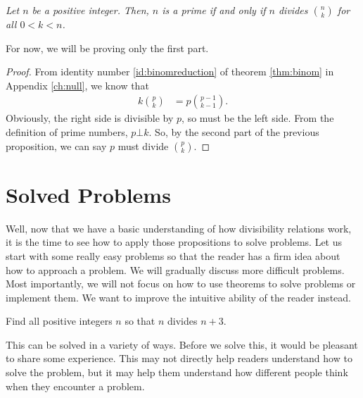 \documentclass{subfile}
\begin{document}
		\begin{theorem}\slshape\label{thm:binpdiv}
			Let $n$ be a positive integer. Then, $n$ is a prime if and only if $n$ divides $\binom{n}{k}$ for all $0<k<n$.
		\end{theorem}%

	For now, we will be proving only the first part.

		\begin{proof}
			From identity number \autoref{id:binomreduction} of theorem \autoref{thm:binom} in Appendix \autoref{ch:null}, we know that
				\begin{align*}
					k\binom{p}{k} & = p\binom{p-1}{k-1}.
				\end{align*}
			Obviously, the right side is divisible by $p$, so must be the left side. From the definition of prime numbers, $p\bot k$. So, by the second part of the previous proposition, we can say $p$ must divide $\binom{p}{k}$.
		\end{proof}

\section{Solved Problems}
	Well, now that we have a basic understanding of how divisibility relations work, it is the time to see how to apply those propositions to solve problems. Let us start with some really easy problems so that the reader has a firm idea about how to approach a problem. We will gradually discuss more difficult problems. Most importantly, we will not focus on how to use theorems to solve problems or implement them. We want to improve the intuitive ability of the reader instead.

		\begin{problem}
			Find all positive integers $n$ so that $n$ divides $n+3$.
		\end{problem}

	This can be solved in a variety of ways. Before we solve this, it would be pleasant to share some experience. This may not directly help readers understand how to solve the problem, but it may help them understand how different people think when they encounter a problem.
\end{document}
